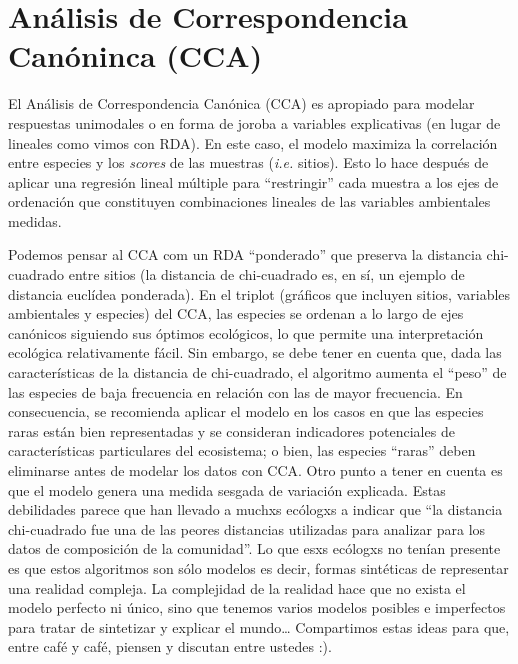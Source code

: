 \documentclass[
]{book}
\begin{document}
\hypertarget{anuxe1lisis-de-correspondencia-canuxf3ninca-cca}{%
\section{Análisis de Correspondencia Canóninca (CCA)}\label{anuxe1lisis-de-correspondencia-canuxf3ninca-cca}}

El Análisis de Correspondencia Canónica (CCA) es apropiado para modelar respuestas unimodales o en forma de joroba a variables explicativas (en lugar de lineales como vimos con RDA). En este caso, el modelo maximiza la correlación entre especies y los \emph{scores} de las muestras (\emph{i.e.} sitios). Esto lo hace después de aplicar una regresión lineal múltiple para ``restringir'' cada muestra a los ejes de ordenación que constituyen combinaciones lineales de las variables ambientales medidas.

Podemos pensar al CCA com un RDA ``ponderado'' que preserva la distancia chi-cuadrado entre sitios (la distancia de chi-cuadrado es, en sí, un ejemplo de distancia euclídea ponderada). En el triplot (gráficos que incluyen sitios, variables ambientales y especies) del CCA, las especies se ordenan a lo largo de ejes canónicos siguiendo sus óptimos ecológicos, lo que permite una interpretación ecológica relativamente fácil. Sin embargo, se debe tener en cuenta que, dada las características de la distancia de chi-cuadrado, el algoritmo aumenta el ``peso'' de las especies de baja frecuencia en relación con las de mayor frecuencia. En consecuencia, se recomienda aplicar el modelo en los casos en que las especies raras están bien representadas y se consideran indicadores potenciales de características particulares del ecosistema; o bien, las especies ``raras'' deben eliminarse antes de modelar los datos con CCA. Otro punto a tener en cuenta es que el modelo genera una medida sesgada de variación explicada. Estas debilidades parece que han llevado a muchxs ecólogxs a indicar que ``la distancia chi-cuadrado fue una de las peores distancias utilizadas para analizar para los datos de composición de la comunidad''. Lo que esxs ecólogxs no tenían presente es que estos algoritmos son sólo modelos es decir, formas sintéticas de representar una realidad compleja. La complejidad de la realidad hace que no exista el modelo perfecto ni único, sino que tenemos varios modelos posibles e imperfectos para tratar de sintetizar y explicar el mundo\ldots{} Compartimos estas ideas para que, entre café y café, piensen y discutan entre ustedes :).
\end{document}
